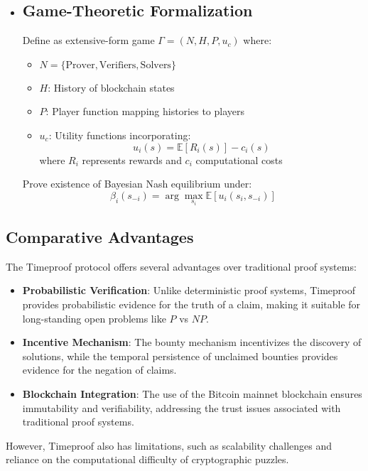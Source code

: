 \documentclass[12pt]{report}
\begin{document}
\begin{itemize}
    \item \subsection{Game-Theoretic Formalization}
    Define as extensive-form game $\Gamma = (N, H, P, u_c)$ where:
    \begin{itemize}
        \item $N = \{\text{Prover}, \text{Verifiers}, \text{Solvers}\}$
        \item $H$: History of blockchain states
        \item $P$: Player function mapping histories to players
        \item $u_c$: Utility functions incorporating:
        \begin{equation*}
            u_i(s) = \mathbb{E}[R_i(s)] - c_i(s)
        \end{equation*}
        where $R_i$ represents rewards and $c_i$ computational costs
    \end{itemize}
    Prove existence of Bayesian Nash equilibrium under:
    \begin{equation*}
        \beta_i(s_{-i}) = \arg\max_{s_i} \mathbb{E}[u_i(s_i, s_{-i})]
    \end{equation*}
\end{itemize}

\subsection{Comparative Advantages}
The Timeproof protocol offers several advantages over traditional proof systems:
\begin{itemize}
    \item \textbf{Probabilistic Verification}: Unlike deterministic proof systems, Timeproof provides probabilistic evidence for the truth of a claim, making it suitable for long-standing open problems like \( P \) vs \( NP \).
    \item \textbf{Incentive Mechanism}: The bounty mechanism incentivizes the discovery of solutions, while the temporal persistence of unclaimed bounties provides evidence for the negation of claims.
    \item \textbf{Blockchain Integration}: The use of the Bitcoin mainnet blockchain ensures immutability and verifiability, addressing the trust issues associated with traditional proof systems.
\end{itemize}
However, Timeproof also has limitations, such as scalability challenges and reliance on the computational difficulty of cryptographic puzzles.
\end{document}
